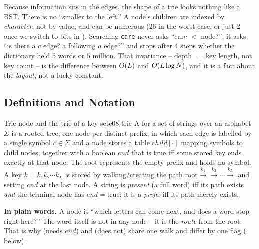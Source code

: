 Because information sits in the edges, the shape of a trie looks nothing like a BST. There is no
``smaller to the left.'' A node's children are indexed by \emph{character}, not by value, and can be
numerous ($26$ in the worst case, or just $2$ once we switch to bits in ). Searching
\texttt{care} never asks ``care $<$ node?''; it asks ``is there a $c$ edge? a following $a$ edge?'' and
stops after $4$ steps whether the dictionary held $5$ words or $5$ million. That invariance -- depth
$=$ key length, not key count -- is the difference between $O(L)$ and $O(L\log N)$, and it is a
fact about the \emph{layout}, not a lucky constant.

\subsection{Definitions and Notation}

\begin{definition}{Trie node and the trie of a key set}{c08-trie}
A  for a set of strings over an alphabet $\Sigma$ is a rooted tree, one node per distinct
prefix, in which each edge is labelled by a single symbol $c\in\Sigma$ and a node stores a table
$\mathit{child}[\cdot]$ mapping symbols to child nodes, together with a boolean $\mathit{end}$ that is
true iff some stored key ends exactly at that node. The root represents the empty prefix and holds no
symbol. A key $k=k_1k_2\cdots k_L$ is stored by walking/creating the path
root$\xrightarrow{k_1}$$\xrightarrow{k_2}$$\cdots$$\xrightarrow{k_L}$ and setting $\mathit{end}$ at the
last node. A string is \emph{present} (a full word) iff its path exists \emph{and} the terminal node has
$\mathit{end}=\text{true}$; it is a \emph{prefix} iff its path merely exists.
\end{definition}

\noindent\textbf{In plain words.} A node is ``which letters can come next, and does a word stop right
here?'' The word itself is not in any node -- it is the \emph{route} from the root. That is why
 (needs $\mathit{end}$) and  (does not) share one walk and differ by one
flag ( below).

